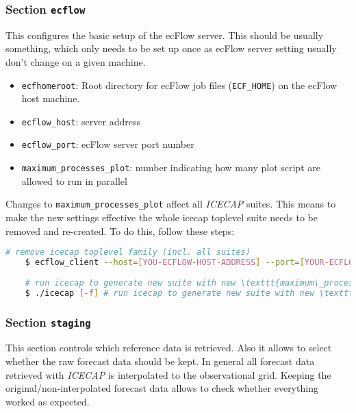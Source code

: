 \documentclass[DIV=10, parskip=full]{scrreprt}
\newcommand{\ice}{\textit{ICECAP}\xspace}
\begin{document}
\subsubsection{Section \texttt{ecflow}} \label{sec:ecflow}
This configures the basic setup of the ecFlow server. This should be usually something, which only needs to be set up once as ecFlow server setting usually don't change on a given machine.
\begin{itemize}
 	\item \texttt{ecfhomeroot}: Root directory for ecFlow job files (\texttt{ECF\_HOME}) on the ecFlow host machine.
 	\item \texttt{ecflow\_host}: server address
 	\item \texttt{ecflow\_port}: ecFlow server port number
 	\item \texttt{maximum\_processes\_plot}: number indicating how many plot script are allowed to run in parallel
 \end{itemize}
 
 Changes to \texttt{maximum\_processes\_plot} affect all \ice suites. This means to make the new settings effective the whole icecap toplevel suite needs to be removed and re-created. To do this, follow these steps:
  \begin{lstlisting}[language=bash]
 	# remove icecap toplevel family (incl. all suites)
 	$ ecflow_client --host=[YOU-ECFLOW-HOST-ADDRESS] --port=[YOUR-ECFLOW-PORT] --delete /icecap
 	
 	# run icecap to generate new suite with new \texttt{maximum\_processes\_plot} value
 	$ ./icecap [-f] # run icecap to generate new suite with new \texttt{maximum\_processes\_plot} value
 \end{lstlisting}
 


\subsubsection{Section \texttt{staging}} \label{sec:config_staging}
This section controls which reference data is retrieved. Also it allows to select whether the raw forecast data should be kept. In general all forecast data retrieved with \ice is interpolated to the observational grid. Keeping the original/non-interpolated forecast data allows to check whether everything worked as expected. 
 
\end{document}
